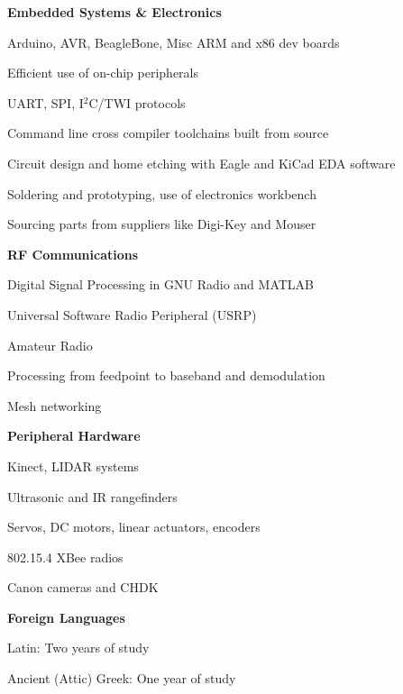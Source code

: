 \documentclass[10pt,letterpaper]{article}
\begin{document}
\begin{itemize*}
    \item \textbf{Embedded Systems \& Electronics}
        \begin{itemize*}
            \item Arduino, AVR, BeagleBone, Misc ARM and x86 dev boards
            \item Efficient use of on-chip peripherals
            \item UART, SPI, I$^2$C/TWI protocols
            \item Command line cross compiler toolchains built from source
            \item Circuit design and home etching with Eagle and KiCad EDA software
            \item Soldering and prototyping, use of electronics workbench
            \item Sourcing parts from suppliers like Digi-Key and Mouser
        \end{itemize*}
    \item \textbf{RF Communications}
        \begin{itemize*}
            \item Digital Signal Processing in GNU Radio and MATLAB
            \item Universal Software Radio Peripheral (USRP)
            \item Amateur Radio
            \item Processing from feedpoint to baseband and demodulation
            \item Mesh networking
        \end{itemize*}
    \item \textbf{Peripheral Hardware}
        \begin{itemize*}
            \item Kinect, LIDAR systems
            \item Ultrasonic and IR rangefinders
            \item Servos, DC motors, linear actuators, encoders
            \item 802.15.4 XBee radios
            \item Canon cameras and CHDK
        \end{itemize*}
    \item \textbf{Foreign Languages}
        \begin{itemize*}
            \item Latin: Two years of study
            \item Ancient (Attic) Greek: One year of study

\end{itemize*}
\end{itemize*}
\end{document}
